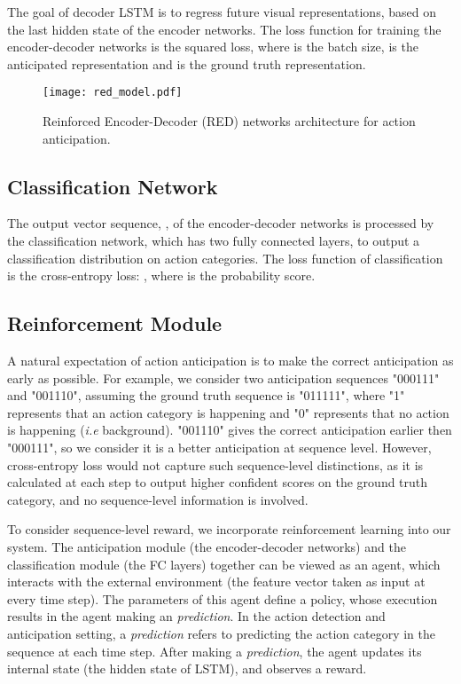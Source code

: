 \documentclass{bmvc2k}
\begin{document}
The goal of decoder LSTM is to regress future visual representations, based on the last hidden state of the encoder networks. The loss function for training the encoder-decoder networks is the squared loss, 
where  is the batch size,  is the anticipated representation and  is the ground truth representation. \begin{figure*}[]
\centering
\texttt{[image: red\_model.pdf]}
\caption{Reinforced Encoder-Decoder (RED) networks architecture for action anticipation. }
\label{model}
\end{figure*}


\subsection{Classification Network}
The output vector sequence, , of the encoder-decoder networks is processed by the classification network, which has two fully connected layers, to output a classification distribution on action categories. The loss function of classification is the cross-entropy loss: , 
where  is the probability score.

\subsection{Reinforcement Module}
A natural expectation of action anticipation is to make the correct anticipation as early as possible. For example, we consider two anticipation sequences "000111" and "001110", assuming the ground truth sequence is "011111", where "1" represents that an action category is happening and "0" represents that no action is happening (\emph{i.e} background). "001110" gives the correct anticipation earlier then "000111", so we consider it is a better anticipation at sequence level. However, cross-entropy loss would not capture such sequence-level distinctions, as it is calculated at each step to output higher confident scores on the ground truth category,  and no sequence-level information is involved.

To consider sequence-level reward, we incorporate reinforcement learning into our system. The anticipation module (the encoder-decoder networks) and the classification module (the FC layers) together can be viewed as an agent, which interacts with the external environment (the feature vector taken as input at every time step). The parameters of this agent define a policy, whose execution results in the agent making an \emph{prediction}. In the action detection and anticipation setting, a \emph{prediction} refers to predicting the action category in the sequence at each time step. After making a \emph{prediction}, the agent updates its internal state (the hidden state of LSTM), and observes a reward. 
\end{document}
